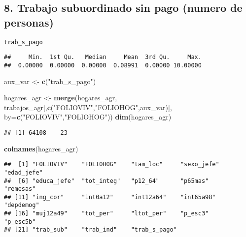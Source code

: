 \documentclass[11pt,]{article}
\newenvironment{Shaded}{\begin{snugshade}}{\end{snugshade}}
\newcommand{\KeywordTok}[1]{\textcolor[rgb]{0.13,0.29,0.53}{\textbf{#1}}}
\newcommand{\DataTypeTok}[1]{\textcolor[rgb]{0.13,0.29,0.53}{#1}}
\newcommand{\StringTok}[1]{\textcolor[rgb]{0.31,0.60,0.02}{#1}}
\newcommand{\CommentTok}[1]{\textcolor[rgb]{0.56,0.35,0.01}{\textit{#1}}}
\newcommand{\OperatorTok}[1]{\textcolor[rgb]{0.81,0.36,0.00}{\textbf{#1}}}
\newcommand{\NormalTok}[1]{#1}
\begin{document}
\subsection{8. Trabajo subuordinado sin pago (numero de
personas)}\label{trabajo-subuordinado-sin-pago-numero-de-personas}

\texttt{trab\_s\_pago}

\begin{Shaded}
\end{Shaded}

\begin{verbatim}
##     Min.  1st Qu.   Median     Mean  3rd Qu.     Max. 
##  0.00000  0.00000  0.00000  0.08991  0.00000 10.00000
\end{verbatim}

\begin{Shaded}
\begin{Highlighting}[]
\NormalTok{aux_var <-}\StringTok{ }\KeywordTok{c}\NormalTok{(}\StringTok{"trab_s_pago"}\NormalTok{)}

\NormalTok{hogares_agr <-}\StringTok{ }\KeywordTok{merge}\NormalTok{(hogares_agr,}
\NormalTok{                     trabajos_agr[,}\KeywordTok{c}\NormalTok{(}\StringTok{"FOLIOVIV"}\NormalTok{,}\StringTok{"FOLIOHOG"}\NormalTok{,aux_var)],}
                     \DataTypeTok{by=}\KeywordTok{c}\NormalTok{(}\StringTok{"FOLIOVIV"}\NormalTok{,}\StringTok{"FOLIOHOG"}\NormalTok{))}
\KeywordTok{dim}\NormalTok{(hogares_agr)}
\end{Highlighting}
\end{Shaded}

\begin{verbatim}
## [1] 64108    23
\end{verbatim}

\begin{Shaded}
\begin{Highlighting}[]
\KeywordTok{colnames}\NormalTok{(hogares_agr)}
\end{Highlighting}
\end{Shaded}

\begin{verbatim}
##  [1] "FOLIOVIV"    "FOLIOHOG"    "tam_loc"     "sexo_jefe"   "edad_jefe"  
##  [6] "educa_jefe"  "tot_integ"   "p12_64"      "p65mas"      "remesas"    
## [11] "ing_cor"     "int0a12"     "int12a64"    "int65a98"    "depdemog"   
## [16] "muj12a49"    "tot_per"     "ltot_per"    "p_esc3"      "p_esc5b"    
## [21] "trab_sub"    "trab_ind"    "trab_s_pago"
\end{verbatim}
\end{document}
